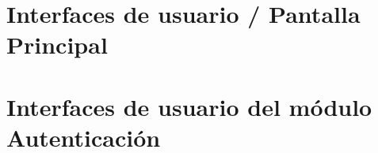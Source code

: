 \section{Interfaces de usuario / Pantalla Principal}

\section{Interfaces de usuario del módulo Autenticación}
